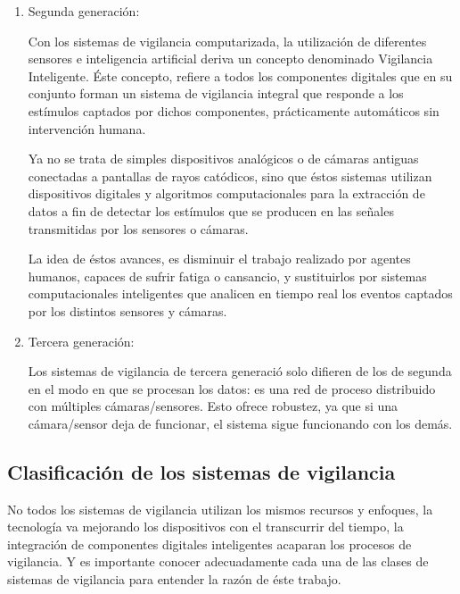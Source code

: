 \documentclass[a4paper,12pt,twoside]{article}
\begin{document}
\begin{enumerate}
	\item Segunda generación: \par
	Con los sistemas de vigilancia computarizada, la utilización de diferentes sensores e inteligencia artificial deriva un concepto denominado Vigilancia Inteligente. Éste concepto, refiere a todos los componentes digitales que en su conjunto forman un sistema de vigilancia integral que responde a los estímulos captados por dichos componentes, prácticamente automáticos sin intervención humana. \par
	Ya no se trata de simples dispositivos analógicos o de cámaras antiguas conectadas a pantallas de rayos catódicos, sino que éstos sistemas utilizan dispositivos digitales y algoritmos computacionales para la extracción de datos a fin de detectar los estímulos que se producen en las señales transmitidas por los sensores o cámaras.
	\par
	La idea de éstos avances, es disminuir el trabajo realizado por agentes humanos, capaces de sufrir fatiga o cansancio, y sustituirlos por sistemas computacionales inteligentes que analicen en tiempo real los eventos captados por los distintos sensores y cámaras.\\
	
	\item Tercera generación: \par
	Los sistemas de vigilancia de tercera generació solo difieren de los de segunda en el modo en que se procesan los datos: es una red de proceso distribuido con múltiples cámaras/sensores. Esto ofrece robustez, ya que si una cámara/sensor deja de funcionar, el sistema sigue funcionando con los demás.
	\\
\end{enumerate}	\baselineskip 14pt



\subsection{Clasificación de los sistemas de vigilancia}

No todos los sistemas de vigilancia utilizan los mismos recursos y enfoques, la tecnología va mejorando los dispositivos con el transcurrir del tiempo, la integración de componentes digitales inteligentes acaparan los procesos de vigilancia. Y es importante conocer adecuadamente cada una de las clases de sistemas de vigilancia para entender la razón de éste trabajo.  \par
\end{document}
